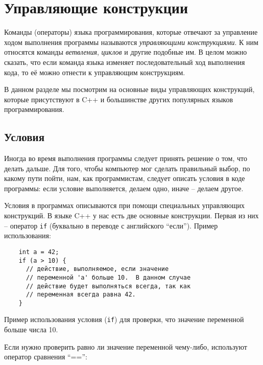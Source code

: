 \documentclass[../sparc.tex]{subfiles}
\begin{document}
\section{Управляющие конструкции}

Команды (операторы) языка программирования, которые отвечают за управление ходом
выполнения программы называются \emph{управляющими конструкциями}.  К ним
относятся команды \emph{ветвления}, \emph{циклов} и другие подобные им.  В целом
можно сказать, что если команда языка изменяет последовательный ход выполнения
кода, то её можно отнести к управляющим конструкциям.

В данном разделе мы посмотрим на основные виды управляющих конструкций, которые
присутствуют в C++ и большинстве других популярных языков программирования.

\subsection{Условия}

Иногда во время выполнения программы следует принять решение о том, что делать
дальше.  Для того, чтобы компьютер мог сделать правильный выбор, по какому пути
пойти, нам, как программистам, следует описать условия в коде программы: если
условие выполняется, делаем одно, иначе -- делаем другое.

Условия в программах описываются при помощи специальных управляющих конструкций.
В языке C++ у нас есть две основные конструкции.  Первая из них -- оператор
\texttt{if} (буквально в переводе с английского ``если'').  Пример
использования:

\begin{listing}[ht]
  \begin{verbatim}
    int a = 42;
    if (a > 10) {
      // действие, выполняемое, если значение
      // переменной 'a' больше 10.  В данном случае
      // действие будет выполняться всегда, так как
      // переменная всегда равна 42.
    }
  \end{verbatim}
  \label{listing:dialogues-with-computer-if-more-than}
  \caption{Пример использования условия (\texttt{if}) для проверки, что значение
    переменной больше числа 10.}
\end{listing}

Если нужно проверить равно ли значение переменной чему-либо, используют оператор
сравнения ``=='':
\end{document}
